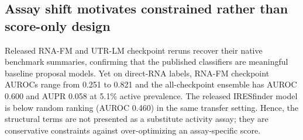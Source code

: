 \subsection{Assay shift motivates constrained rather than score-only design}
Released RNA-FM and UTR-LM checkpoint reruns recover their native benchmark
summaries, confirming that the published classifiers are meaningful baseline
proposal models. Yet on direct-RNA labels, RNA-FM checkpoint AUROCs range from
0.251 to 0.821 and the all-checkpoint ensemble has AUROC 0.600 and AUPR 0.058
at 5.1\% active prevalence. The released IRESfinder model is below random
ranking (AUROC 0.460) in the same transfer setting. Hence, the structural
terms are not presented as a substitute activity assay; they are conservative
constraints against over-optimizing an assay-specific score.
